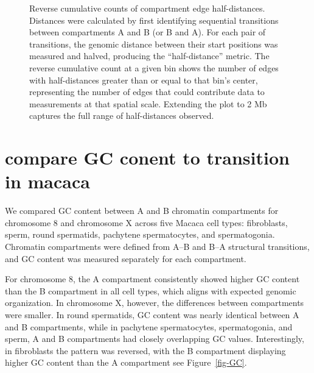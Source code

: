 \documentclass[
  a4paper,
  openany]{scrbook}
\begin{document}
\begin{figure}


\caption{\label{fig-edge}Reverse cumulative counts of compartment edge
half-distances. Distances were calculated by first identifying
sequential transitions between compartments A and B (or B and A). For
each pair of transitions, the genomic distance between their start
positions was measured and halved, producing the ``half-distance''
metric. The reverse cumulative count at a given bin shows the number of
edges with half-distances greater than or equal to that bin's center,
representing the number of edges that could contribute data to
measurements at that spatial scale. Extending the plot to 2 Mb captures
the full range of half-distances observed.}

\end{figure}%

\section{compare GC conent to transition in
macaca}\label{compare-gc-conent-to-transition-in-macaca}

We compared GC content between A and B chromatin compartments for
chromosome 8 and chromosome X across five Macaca cell types:
fibroblasts, sperm, round spermatids, pachytene spermatocytes, and
spermatogonia. Chromatin compartments were defined from A--B and B--A
structural transitions, and GC content was measured separately for each
compartment.

For chromosome 8, the A compartment consistently showed higher GC
content than the B compartment in all cell types, which aligns with
expected genomic organization. In chromosome X, however, the differences
between compartments were smaller. In round spermatids, GC content was
nearly identical between A and B compartments, while in pachytene
spermatocytes, spermatogonia, and sperm, A and B compartments had
closely overlapping GC values. Interestingly, in fibroblasts the pattern
was reversed, with the B compartment displaying higher GC content than
the A compartment see Figure~\ref{fig-GC}.
\end{document}
